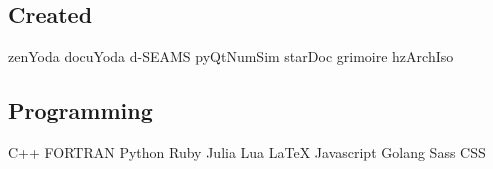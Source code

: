 \documentclass[letterpaper]{deedy-resume} %
\begin{document}
\begin{minipage}[t]{0.36\textwidth}
	\subsection{Created}
	zenYoda \textbullet{} docuYoda \textbullet{} d-SEAMS \textbullet{} pyQtNumSim \textbullet{} starDoc \textbullet{} grimoire \textbullet{} hzArchIso\\
	\subsection{Programming}
	C++\textbullet{} FORTRAN\textbullet{} Python\textbullet{} Ruby \textbullet{} Julia \textbullet{} Lua \textbullet{} LaTeX \textbullet{} Javascript \textbullet{} Golang \textbullet{} Sass \textbullet{} CSS

\end{minipage} %
\hfill
%
%
\end{document}
